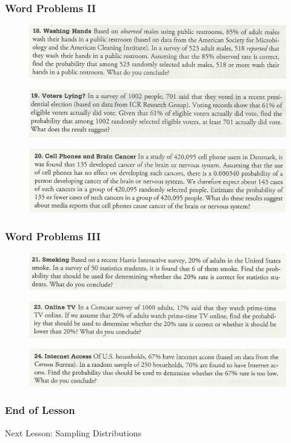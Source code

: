 \documentclass[xcolor=dvipsnames]{beamer}
\begin{document}
\begin{frame}
  \frametitle{Word Problems II}
  \begin{figure}[h]
    \includegraphics[scale=.7]{./diagrams/triola1.png}
  \end{figure}
  \begin{figure}[h]
    \includegraphics[scale=.7]{./diagrams/triola2.png}
  \end{figure}
  \begin{figure}[h]
    \includegraphics[scale=.7]{./diagrams/triola3.png}
  \end{figure}
\end{frame}

\begin{frame}
  \frametitle{Word Problems III}
  \begin{figure}[h]
    \includegraphics[scale=.7]{./diagrams/triola4.png}
  \end{figure}
  \begin{figure}[h]
    \includegraphics[scale=.7]{./diagrams/triola5.png}
  \end{figure}
  \begin{figure}[h]
    \includegraphics[scale=.7]{./diagrams/triola6.png}
  \end{figure}
\end{frame}

\begin{frame}
  \frametitle{End of Lesson}
Next Lesson: Sampling Distributions
\end{frame}
\end{document}
